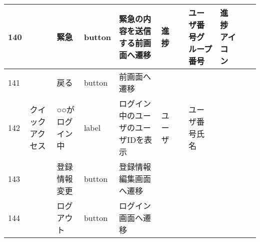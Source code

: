 \begin{landscape}
\begin{table}[]
\begin{tabular}{|l|l|l|l|l|l|l|l|l|l|l|}
140 &               & 緊急               & button   & 緊急の内容を送信する前画面へ遷移                                                  & 進捗      &                       & ユーザ番号グループ番号        & 進捗アイコン          &                               &                                                                \\ \hline
141 &               & 戻る               & button   & 前画面へ遷移                                                            &         &                       &                    &                 &                               &                                                                \\ \hline
142 & クイックアクセス      & ○○がログイン中         & label    & ログイン中のユーザのユーザIDを表示                                                & ユーザ     &                       & ユーザ番号氏名            &                 &                               &                                                                \\ \hline
143 &               & 登録情報変更           & button   & 登録情報編集画面へ遷移                                                       &         &                       &                    &                 &                               &                                                                \\ \hline
144 &               & ログアウト            & button   & ログイン画面へ遷移                                                         &         &                       &                    &                 &                               &                                                                \\ \hline
\end{tabular}
\end{table}

\end{landscape}
